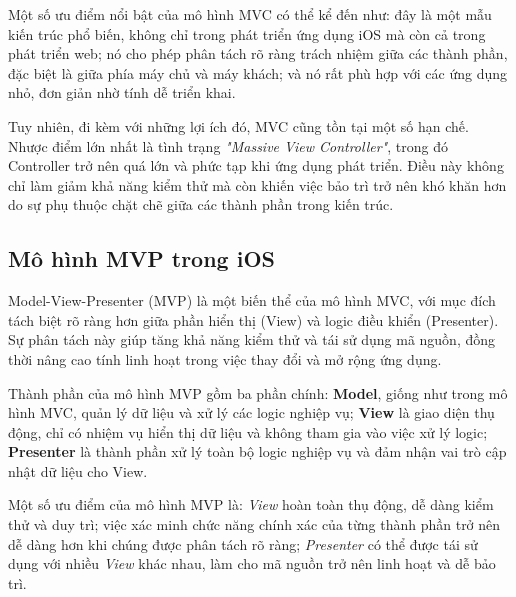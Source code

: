 \vspace{0.5em}

  Một số ưu điểm nổi bật của mô hình MVC có thể kể đến như: đây là một mẫu kiến trúc phổ biến, không chỉ trong phát triển ứng dụng iOS mà còn cả trong phát triển web; nó cho phép phân tách rõ ràng trách nhiệm giữa các thành phần, đặc biệt là giữa phía máy chủ và máy khách; và nó rất phù hợp với các ứng dụng nhỏ, đơn giản nhờ tính dễ triển khai.

  \vspace{0.5em}

  Tuy nhiên, đi kèm với những lợi ích đó, MVC cũng tồn tại một số hạn chế. Nhược điểm lớn nhất là tình trạng \textit{"Massive View Controller"}, trong đó Controller trở nên quá lớn và phức tạp khi ứng dụng phát triển. Điều này không chỉ làm giảm khả năng kiểm thử mà còn khiến việc bảo trì trở nên khó khăn hơn do sự phụ thuộc chặt chẽ giữa các thành phần trong kiến trúc.

\subsection{Mô hình MVP trong iOS}

Model-View-Presenter (MVP) là một biến thể của mô hình MVC, với mục đích tách biệt rõ ràng hơn giữa phần hiển thị (View) và logic điều khiển (Presenter). Sự phân tách này giúp tăng khả năng kiểm thử và tái sử dụng mã nguồn, đồng thời nâng cao tính linh hoạt trong việc thay đổi và mở rộng ứng dụng.

\vspace{0.5em}

  Thành phần của mô hình MVP gồm ba phần chính: \textbf{Model}, giống như trong mô hình MVC, quản lý dữ liệu và xử lý các logic nghiệp vụ; \textbf{View} là giao diện thụ động, chỉ có nhiệm vụ hiển thị dữ liệu và không tham gia vào việc xử lý logic; \textbf{Presenter} là thành phần xử lý toàn bộ logic nghiệp vụ và đảm nhận vai trò cập nhật dữ liệu cho View.

  \vspace{0.5em}

  Một số ưu điểm của mô hình MVP là: \textit{View} hoàn toàn thụ động, dễ dàng kiểm thử và duy trì; việc xác minh chức năng chính xác của từng thành phần trở nên dễ dàng hơn khi chúng được phân tách rõ ràng; \textit{Presenter} có thể được tái sử dụng với nhiều \textit{View} khác nhau, làm cho mã nguồn trở nên linh hoạt và dễ bảo trì.

  \vspace{0.5em}

